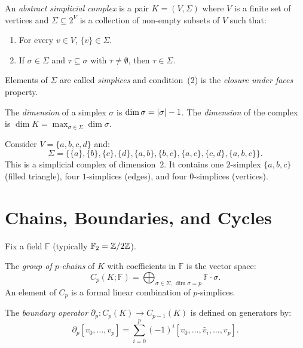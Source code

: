 \begin{definition}
An \emph{abstract simplicial complex} is a pair $K = (V, \Sigma)$ where
$V$ is a finite set of vertices and $\Sigma \subseteq 2^V$ is a
collection of non-empty subsets of $V$ such that:
\begin{enumerate}
  \item For every $v \in V$, $\{v\} \in \Sigma$.
  \item If $\sigma \in \Sigma$ and $\tau \subseteq \sigma$ with
        $\tau \neq \emptyset$, then $\tau \in \Sigma$.
\end{enumerate}
Elements of $\Sigma$ are called \emph{simplices} and condition~(2) is
the \emph{closure under faces} property.
\end{definition}

\begin{definition}[Dimension]
The \emph{dimension} of a simplex $\sigma$ is
$\dim \sigma = \left| \sigma \right| - 1$. The \emph{dimension} of the complex
is $\dim K = \max_{\sigma \in \Sigma} \dim \sigma$.
\end{definition}

\begin{example}
Consider $V = \{a, b, c, d\}$ and:
\[
  \Sigma = \big\{
    \{a\}, \{b\}, \{c\}, \{d\},
    \{a,b\}, \{b,c\}, \{a,c\}, \{c,d\},
    \{a,b,c\}
  \big\}.
\]
This is a simplicial complex of dimension~$2$. It contains one
$2$-simplex $\{a,b,c\}$ (filled triangle), four $1$-simplices (edges),
and four $0$-simplices (vertices).
\end{example}

\section{Chains, Boundaries, and Cycles}

Fix a field $\mathbb{F}$ (typically $\mathbb{F}_2 = \mathbb{Z} / 2\mathbb{Z}$).

\begin{definition}
The \emph{group of $p$-chains} of $K$ with coefficients in $\mathbb{F}$
is the vector space:
\[
  C_p(K; \mathbb{F}) = \bigoplus_{\sigma \in \Sigma,\, \dim \sigma = p}
  \mathbb{F} \cdot \sigma.
\]
An element of $C_p$ is a formal linear combination of $p$-simplices.
\end{definition}

\begin{definition}
The \emph{boundary operator} $\partial_p : C_p(K) \to C_{p-1}(K)$ is
defined on generators by:
\[
  \partial_p [v_0, \ldots, v_p]
  = \sum_{i=0}^{p} (-1)^i [v_0, \ldots, \hat{v}_i, \ldots, v_p].
\]
\end{definition}

